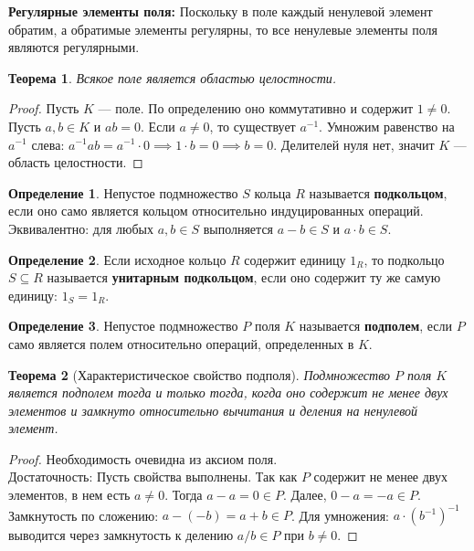 \documentclass[12pt, a4paper]{article}
\theoremstyle{definition}
\newtheorem{definition}{Определение}[section]
\theoremstyle{plain}
\newtheorem{theorem}{Теорема}[section]
\begin{document}
	\textbf{Регулярные элементы поля:} Поскольку в поле каждый ненулевой элемент обратим, а обратимые элементы регулярны, то все ненулевые элементы поля являются регулярными.
	
	\begin{theorem}
		Всякое поле является областью целостности.
	\end{theorem}
	\begin{proof}
		Пусть $K$ — поле. По определению оно коммутативно и содержит $1 \neq 0$. Пусть $a, b \in K$ и $ab = 0$. Если $a \neq 0$, то существует $a^{-1}$. Умножим равенство на $a^{-1}$ слева: $a^{-1}ab = a^{-1} \cdot 0 \implies 1 \cdot b = 0 \implies b = 0$. Делителей нуля нет, значит $K$ — область целостности.
	\end{proof}
	
	\begin{definition}
		Непустое подмножество $S$ кольца $R$ называется \textbf{подкольцом}, если оно само является кольцом относительно индуцированных операций. Эквивалентно: для любых $a,b \in S$ выполняется $a-b \in S$ и $a \cdot b \in S$.
	\end{definition}
	
	\begin{definition}
		Если исходное кольцо $R$ содержит единицу $1_R$, то подкольцо $S \subseteq R$ называется \textbf{унитарным подкольцом}, если оно содержит ту же самую единицу: $1_S = 1_R$.
	\end{definition}
	
	\begin{definition}
		Непустое подмножество $P$ поля $K$ называется \textbf{подполем}, если $P$ само является полем относительно операций, определенных в $K$.
	\end{definition}
	
	\begin{theorem}[Характеристическое свойство подполя]
		Подмножество $P$ поля $K$ является подполем тогда и только тогда, когда оно содержит не менее двух элементов и замкнуто относительно вычитания и деления на ненулевой элемент.
	\end{theorem}
	\begin{proof}
		Необходимость очевидна из аксиом поля. \\
		Достаточность: Пусть свойства выполнены. Так как $P$ содержит не менее двух элементов, в нем есть $a \neq 0$. Тогда $a-a = 0 \in P$. Далее, $0-a = -a \in P$. Замкнутость по сложению: $a - (-b) = a+b \in P$. Для умножения: $a \cdot (b^{-1})^{-1}$ выводится через замкнутость к делению $a/b \in P$ при $b \neq 0$.
	\end{proof}
	
\end{document}
